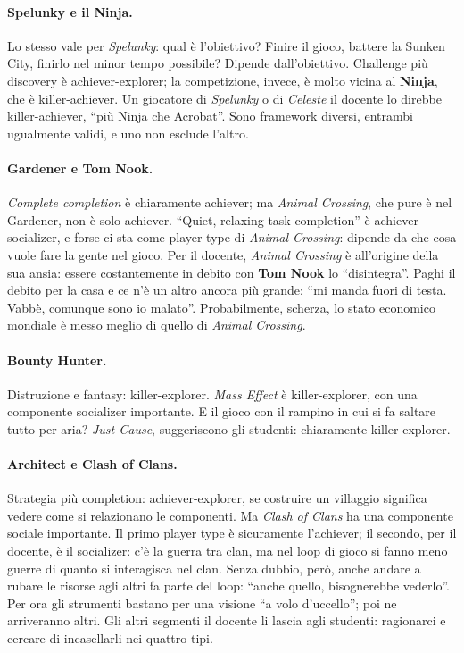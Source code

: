 \paragraph{Spelunky e il Ninja.} Lo stesso vale per \emph{Spelunky}: qual è
l'obiettivo? Finire il gioco, battere la Sunken City, finirlo nel minor tempo
possibile? Dipende dall'obiettivo. Challenge più discovery è achiever-explorer;
la competizione, invece, è molto vicina al \textbf{Ninja}, che è killer-achiever. Un
giocatore di \emph{Spelunky} o di \emph{Celeste} il docente lo direbbe
killer-achiever, ``più Ninja che Acrobat''. Sono framework diversi, entrambi
ugualmente validi, e uno non esclude l'altro.

\paragraph{Gardener e Tom Nook.} \emph{Complete completion} è chiaramente achiever;
ma \emph{Animal Crossing}, che pure è nel Gardener, non è solo achiever. ``Quiet,
relaxing task completion'' è achiever-socializer, e forse ci sta come player type di
\emph{Animal Crossing}: dipende da che cosa vuole fare la gente nel gioco. Per il
docente, \emph{Animal Crossing} è all'origine della sua ansia: essere costantemente
in debito con \textbf{Tom Nook} lo ``disintegra''. Paghi il debito per la casa e ce
n'è un altro ancora più grande: ``mi manda fuori di testa. Vabbè, comunque sono io
malato''. Probabilmente, scherza, lo stato economico mondiale è messo meglio di quello
di \emph{Animal Crossing}.

\paragraph{Bounty Hunter.} Distruzione e fantasy: killer-explorer. \emph{Mass Effect}
è killer-explorer, con una componente socializer importante. E il gioco con il
rampino in cui si fa saltare tutto per aria? \emph{Just Cause}, suggeriscono gli
studenti: chiaramente killer-explorer.

\paragraph{Architect e Clash of Clans.} Strategia più completion: achiever-explorer,
se costruire un villaggio significa vedere come si relazionano le componenti. Ma
\emph{Clash of Clans} ha una componente sociale importante. Il primo player type è
sicuramente l'achiever; il secondo, per il docente, è il socializer: c'è la guerra tra
clan, ma nel loop di gioco si fanno meno guerre di quanto si interagisca nel clan.
Senza dubbio, però, anche andare a rubare le risorse agli altri fa parte del loop:
``anche quello, bisognerebbe vederlo''. Per ora gli strumenti bastano per una visione
``a volo d'uccello''; poi ne arriveranno altri. Gli altri segmenti il docente li
lascia agli studenti: ragionarci e cercare di incasellarli nei quattro tipi.

